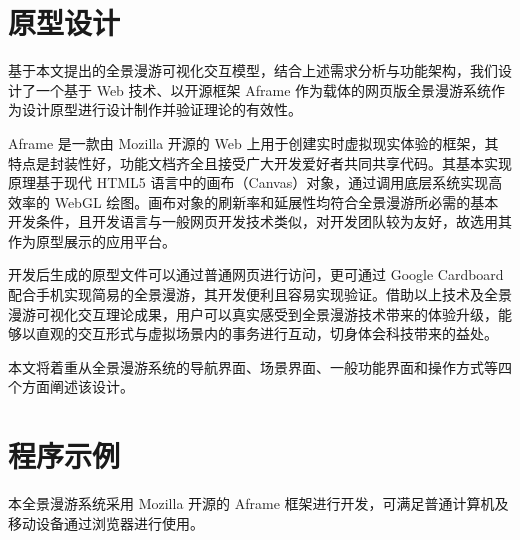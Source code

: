 \section{原型设计}
基于本文提出的全景漫游可视化交互模型，结合上述需求分析与功能架构，我们设计了一个基于 Web 技术、以开源框架 Aframe 作为载体的网页版全景漫游系统作为设计原型进行设计制作并验证理论的有效性。

Aframe 是一款由 Mozilla 开源的 Web 上用于创建实时虚拟现实体验的框架，其特点是封装性好，功能文档齐全且接受广大开发爱好者共同共享代码。其基本实现原理基于现代 HTML5 语言中的画布（Canvas）对象，通过调用底层系统实现高效率的 WebGL 绘图。画布对象的刷新率和延展性均符合全景漫游所必需的基本开发条件，且开发语言与一般网页开发技术类似，对开发团队较为友好，故选用其作为原型展示的应用平台。

开发后生成的原型文件可以通过普通网页进行访问，更可通过 Google Cardboard 配合手机实现简易的全景漫游，其开发便利且容易实现验证。借助以上技术及全景漫游可视化交互理论成果，用户可以真实感受到全景漫游技术带来的体验升级，能够以直观的交互形式与虚拟场景内的事务进行互动，切身体会科技带来的益处。

本文将着重从全景漫游系统的导航界面、场景界面、一般功能界面和操作方式等四个方面阐述该设计。


\section{程序示例}
本全景漫游系统采用 Mozilla 开源的 Aframe 框架进行开发，可满足普通计算机及移动设备通过浏览器进行使用。

